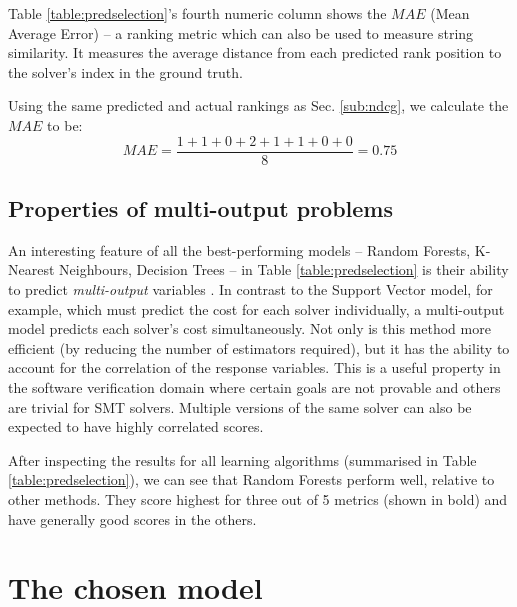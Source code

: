 Table \ref{table:predselection}'s fourth numeric column shows the 
$MAE$ (Mean Average Error) -- a ranking metric which can also be used to measure string similarity. It measures the average distance from each predicted rank position to the solver's index in the ground truth.

Using the same predicted and actual rankings as Sec. \ref{sub:ndcg}, we calculate the $MAE$ to be:
\[
	MAE = \frac{1 + 1 + 0 + 2 + 1 + 1 + 0 + 0}{8} = 0.75
\]

\subsection{Properties of multi-output problems}
\label{sub:multi}

An interesting feature of all the best-performing models -- Random Forests, K-Nearest Neighbours, Decision Trees -- in Table \ref{table:predselection} is their ability to predict \textit{multi-output} variables \cite{multisurvey}. 
In contrast to the Support Vector model, for example, which must predict the cost for each solver individually, a multi-output model predicts each solver's cost simultaneously. 
Not only is this method more efficient (by reducing the number of estimators required), but it has the ability to account for the correlation of the response variables. 
This is a useful property in the software verification domain where certain goals are not provable and others are trivial for SMT solvers. 
Multiple versions of the same solver can also be expected to have highly correlated scores.

After inspecting the results for all learning algorithms (summarised in Table \ref{table:predselection}), we can see that Random Forests \cite{RandomForests} perform well, relative to other methods. 
They score highest for three out of 5 metrics (shown in bold) and have generally good scores in the others.

\section{The chosen model}
\label{sec:chosen}


